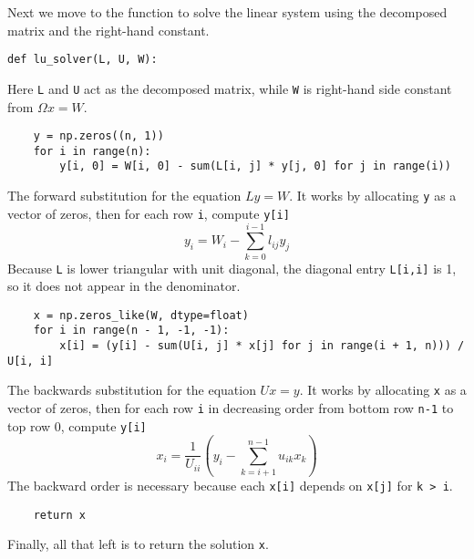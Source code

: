 \documentclass[../../../main.tex]{subfiles}
\begin{document}
Next we move to the function to solve the linear system using the decomposed matrix and the right-hand constant.
\begin{verbatim}
def lu_solver(L, U, W):
\end{verbatim}
Here \verb|L| and \verb|U| act as the decomposed matrix, while \verb|W| is right-hand side constant from $\Omega x=W$.
\begin{verbatim}
    y = np.zeros((n, 1))
    for i in range(n):
        y[i, 0] = W[i, 0] - sum(L[i, j] * y[j, 0] for j in range(i))
\end{verbatim}
The forward substitution for the equation $Ly=W$.
It works by allocating \verb|y| as a vector of zeros, then for each row \verb|i|, compute \verb|y[i]|
\begin{equation*}
    y_i=W_i-\sum_{k=0 }^{i-1 }l_{ij}y_{j}
\end{equation*}
Because \verb|L| is lower triangular with unit diagonal, the diagonal entry \verb|L[i,i]| is 1, so it does not appear in the denominator.
\begin{verbatim}
    x = np.zeros_like(W, dtype=float)
    for i in range(n - 1, -1, -1):
        x[i] = (y[i] - sum(U[i, j] * x[j] for j in range(i + 1, n))) / U[i, i]
\end{verbatim}
The backwards substitution for the equation $Ux=y$.
It works by allocating \verb|x| as a vector of zeros, then for each row \verb|i| in decreasing order from bottom row \verb|n-1| to top row 0, compute \verb|y[i]|
\begin{equation*}
    x_i=\frac{1 }{U_{ii}}\left( y_i-\sum_{k=i+1 }^{n-1 }u_{ik}x_{k} \right)
\end{equation*}
The backward order is necessary because each \verb|x[i]| depends on \verb|x[j]| for \verb|k > i|.
\begin{verbatim}
    return x
\end{verbatim}
Finally, all that left is to return the solution \verb|x|.
\end{document}
